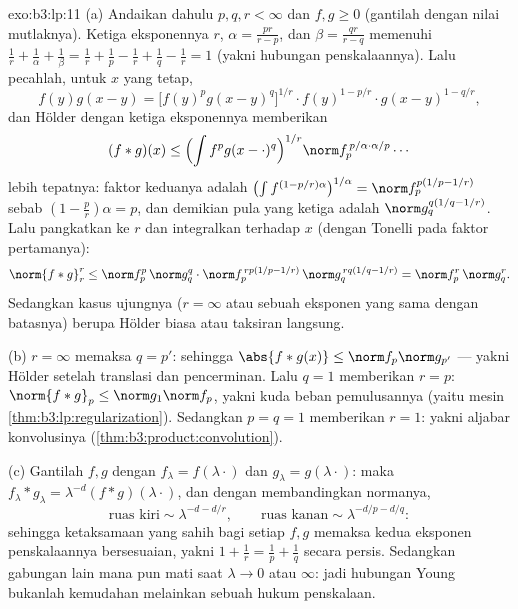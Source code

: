 \begin{solution}{exo:b3:lp:11}
(a) Andaikan dahulu $p, q, r < \infty$ dan $f, g \geq 0$
(gantilah dengan nilai mutlaknya). Ketiga eksponennya $r$,
$\alpha = \frac{pr}{r-p}$, dan $\beta = \frac{qr}{r-q}$
memenuhi $\frac1r + \frac1\alpha + \frac1\beta = \frac1r +
\frac1p - \frac1r + \frac1q - \frac1r = 1$ (yakni hubungan
penskalaannya). Lalu pecahlah, untuk $x$ yang tetap,
\[
f(y)g(x-y) = \bigl[f(y)^pg(x-y)^q\bigr]^{1/r}\cdot
f(y)^{1 - p/r}\cdot g(x-y)^{1 - q/r},
\]
dan Hölder dengan ketiga eksponennya memberikan
\[
(f*g)(x) \leq \Bigl(\int f^pg(x-\cdot)^q\Bigr)^{1/r}
\norm f_p^{\,p/\alpha\cdot\alpha/p}\cdots
\]
lebih tepatnya: faktor keduanya adalah
$\bigl(\int f^{(1-p/r)\alpha}\bigr)^{1/\alpha} =
\norm f_p^{p(1/p - 1/r)}$ sebab $(1 - \frac pr)\alpha = p$,
dan demikian pula yang ketiga adalah $\norm g_q^{q(1/q - 1/r)}$. Lalu pangkatkan
ke $r$ dan integralkan terhadap $x$ (dengan Tonelli pada
faktor pertamanya):
\[
\norm{f*g}_r^r \leq \norm f_p^p\,\norm g_q^q\cdot
\norm f_p^{\,rp(1/p - 1/r)}\,\norm g_q^{\,rq(1/q - 1/r)}
= \norm f_p^r\,\norm g_q^r .
\]
Sedangkan kasus ujungnya ($r = \infty$ atau sebuah eksponen yang sama dengan
batasnya) berupa Hölder biasa atau taksiran langsung.

(b) $r = \infty$ memaksa $q = p'$: sehingga $\abs{f*g(x)} \leq \norm
f_p\norm g_{p'}$ --- yakni Hölder setelah translasi dan pencerminan.
Lalu $q = 1$ memberikan $r = p$: $\norm{f*g}_p \leq \norm
g_1\norm f_p$, yakni kuda beban pemulusannya
(yaitu mesin \cref{thm:b3:lp:regularization}). Sedangkan $p = q = 1$
memberikan $r = 1$: yakni aljabar konvolusinya
(\cref{thm:b3:product:convolution}).

(c) Gantilah $f, g$ dengan $f_\lambda = f(\lambda\cdot)$ dan
$g_\lambda = g(\lambda\cdot)$: maka $f_\lambda*g_\lambda =
\lambda^{-d}(f*g)(\lambda\cdot)$, dan dengan membandingkan normanya,
\[
\text{ruas kiri} \sim \lambda^{-d - d/r}, \qquad
\text{ruas kanan} \sim \lambda^{-d/p - d/q} :
\]
sehingga ketaksamaan yang sahih bagi setiap $f, g$ memaksa kedua eksponen
penskalaannya bersesuaian, yakni $1 + \frac1r = \frac1p + \frac1q$
secara persis. Sedangkan gabungan lain mana pun mati saat $\lambda \to 0$ atau
$\infty$: jadi hubungan Young bukanlah kemudahan melainkan sebuah
hukum penskalaan.
\end{solution}

